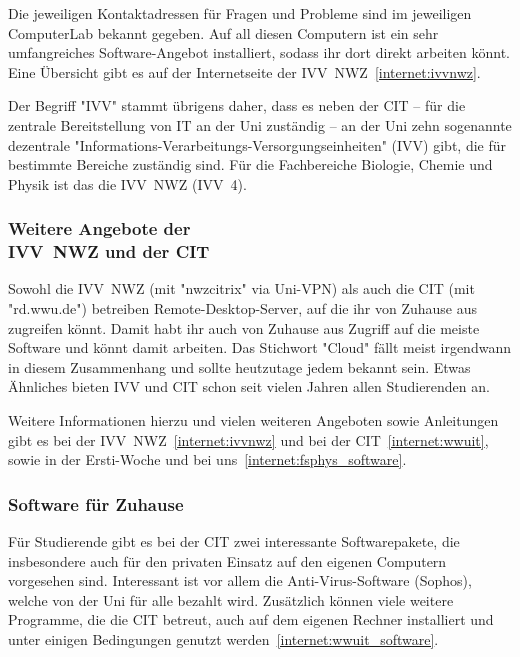 \begin{multicols}{2}
Die jeweiligen Kontaktadressen für Fragen und Probleme sind im jeweiligen ComputerLab bekannt gegeben.
Auf all diesen Computern ist ein sehr umfangreiches Software-Angebot installiert, sodass ihr dort direkt arbeiten könnt.
Eine Übersicht gibt es auf der Internetseite der IVV~NWZ~\cref{internet:ivvnwz}.

Der Begriff "IVV" stammt übrigens daher, dass es neben der CIT -- für die zentrale Bereitstellung von IT an der Uni zuständig -- an der Uni zehn sogenannte dezentrale "Informations-Verarbeitungs-Versorgungseinheiten" (IVV) gibt, die für bestimmte Bereiche zuständig sind.
Für die Fachbereiche Biologie, Chemie und Physik ist das die IVV~NWZ (IVV~4).

\subsubsection[Weitere Angebote der IVV~NWZ und der CIT]{Weitere Angebote der\\IVV~NWZ und der CIT}
Sowohl die IVV~NWZ (mit "nwzcitrix" via Uni-VPN) als auch die CIT (mit "rd.wwu.de") betreiben Remote-Desktop-Server, auf die ihr von Zuhause aus zugreifen könnt.
Damit habt ihr auch von Zuhause aus Zugriff auf die meiste Software und könnt damit arbeiten.
Das Stichwort "Cloud" fällt meist irgendwann in diesem Zusammenhang und sollte heutzutage jedem bekannt sein.
Etwas Ähnliches bieten IVV und CIT schon seit vielen Jahren allen Studierenden an.

Weitere Informationen hierzu und vielen weiteren Angeboten sowie Anleitungen gibt es bei der IVV~NWZ~\cref{internet:ivvnwz} und bei der CIT~\cref{internet:wwuit}, sowie in der Ersti-Woche und bei uns~\cref{internet:fsphys_software}.

\subsubsection{Software für Zuhause}
Für Studierende gibt es bei der CIT zwei interessante Softwarepakete, die insbesondere auch für den privaten Einsatz auf den eigenen Computern vorgesehen sind.
Interessant ist vor allem die Anti-Virus-Software (Sophos), welche von der Uni für alle bezahlt wird.
Zusätzlich können viele weitere Programme, die die CIT betreut, auch auf dem eigenen Rechner installiert und unter einigen Bedingungen genutzt werden~\cref{internet:wwuit_software}.


\end{multicols}
